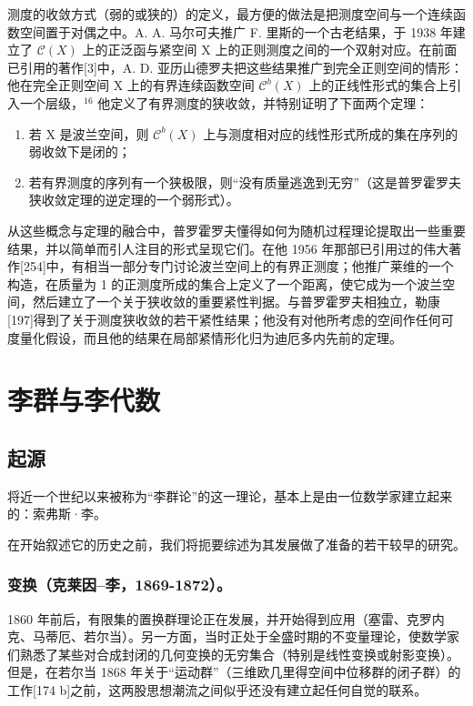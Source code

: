 测度的收敛方式（弱的或狭的）的定义，最方便的做法是把测度空间与一个连续函数空间置于对偶之中。A. A. 马尔可夫推广 F. 里斯的一个古老结果，于 1938 年建立了 \(\mathcal{C}(X)\) 上的正泛函与紧空间 X 上的正则测度之间的一个双射对应。在前面已引用的著作{[}3{]}中，A. D. 亚历山德罗夫把这些结果推广到完全正则空间的情形：他在完全正则空间 X 上的有界连续函数空间 \(\mathcal{C}^{b}(X)\) 上的正线性形式的集合上引入一个层级，\(^{16}\) 他定义了有界测度的狭收敛，并特别证明了下面两个定理：

\begin{enumerate}
\def\labelenumi{\alph{enumi})}
\item
  若 X 是波兰空间，则 \(\mathcal{C}^{b}(X)\) 上与测度相对应的线性形式所成的集在序列的弱收敛下是闭的；
\item
  若有界测度的序列有一个狭极限，则“没有质量逃逸到无穷”（这是普罗霍罗夫狭收敛定理的逆定理的一个弱形式）。
\end{enumerate}

从这些概念与定理的融合中，普罗霍罗夫懂得如何为随机过程理论提取出一些重要结果，并以简单而引人注目的形式呈现它们。在他 1956 年那部已引用过的伟大著作{[}254{]}中，有相当一部分专门讨论波兰空间上的有界正测度；他推广莱维的一个构造，在质量为 1 的正测度所成的集合上定义了一个距离，使它成为一个波兰空间，然后建立了一个关于狭收敛的重要紧性判据。与普罗霍罗夫相独立，勒康{[}197{]}得到了关于测度狭收敛的若干紧性结果；他没有对他所考虑的空间作任何可度量化假设，而且他的结果在局部紧情形化归为迪厄多内先前的定理。

\chapter{李群与李代数}

\section{起源}

将近一个世纪以来被称为“李群论”的这一理论，基本上是由一位数学家建立起来的：索弗斯·李。

在开始叙述它的历史之前，我们将扼要综述为其发展做了准备的若干较早的研究。

\subsection{变换（克莱因–李，1869-1872）。}


1860 年前后，有限集的置换群理论正在发展，并开始得到应用（塞雷、克罗内克、马蒂厄、若尔当）。另一方面，当时正处于全盛时期的不变量理论，使数学家们熟悉了某些对合成封闭的几何变换的无穷集合（特别是线性变换或射影变换）。但是，在若尔当 1868 年关于“运动群”（三维欧几里得空间中位移群的闭子群）的工作{[}174 b{]}之前，这两股思想潮流之间似乎还没有建立起任何自觉的联系。

